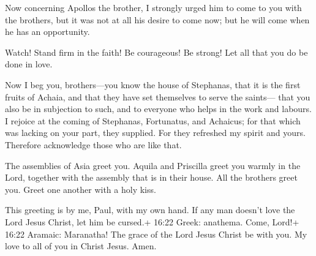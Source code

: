  Now concerning Apollos the brother, I strongly urged him
to come to you with the brothers, but it was not at all his desire to
come now; but he will come when he has an opportunity.

 Watch! Stand firm in the faith! Be courageous! Be strong!
 Let all that you do be done in love.

 Now I beg you, brothers---you know the house of Stephanas,
that it is the first fruits of Achaia, and that they have set themselves
to serve the saints---  that you also be in subjection to
such, and to everyone who helps in the work and labours.  I
rejoice at the coming of Stephanas, Fortunatus, and Achaicus; for that
which was lacking on your part, they supplied.  For they
refreshed my spirit and yours. Therefore acknowledge those who are like
that.

 The assemblies of Asia greet you. Aquila and Priscilla
greet you warmly in the Lord, together with the assembly that is in
their house.  All the brothers greet you. Greet one another
with a holy kiss.

 This greeting is by me, Paul, with my own hand.
 If any man doesn't love the Lord Jesus Christ, let him be
cursed.+ 16:22 Greek: anathema. Come, Lord!+ 16:22 Aramaic: Maranatha!
 The grace of the Lord Jesus Christ be with you.
 My love to all of you in Christ Jesus. Amen.
